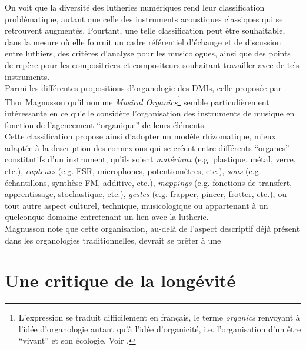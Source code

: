 \noindent On voit que la diversité des lutheries numériques rend leur classification problématique, autant que celle des instruments acoustiques classiques qui se retrouvent augmentés. Pourtant, une telle classification peut être souhaitable, dans la mesure où elle fournit un cadre référentiel d'échange et de discussion entre luthiers, des critères d'analyse pour les musicologues, ainsi que des points de repère pour les compositrices et compositeurs souhaitant travailler avec de tels instruments. \\
\indent Parmi les différentes propositions d'organologie des \glspl{DMI}, celle proposée par Thor Magnusson qu'il nomme \textit{Musical Organics}\footnote{L'expression se traduit difficilement en français, le terme \textit{organics} renvoyant à l'idée d'organologie autant qu'à l'idée d'organicité, i.e. l'organisation d'un être ``vivant'' et son écologie. Voir \cite{magnusson_musical_2017}.} semble particulièrement intéressante en ce qu'elle considère l'organisation des instruments de musique en fonction de l'agencement ``organique'' de leurs éléments.\\
\indent Cette classification propose ainsi d'adopter un modèle rhizomatique, mieux adaptée à la description des connexions qui se créent entre différents ``organes'' constitutifs d'un instrument, qu'ils soient \textit{matériaux} (e.g. plastique, métal, verre, etc.), \textit{capteurs} (e.g. \gls{FSR}, microphones, potentiomètres, etc.), \textit{sons} (e.g. échantillons, synthèse FM, additive, etc.), \textit{\glspl{mapping}} (e.g. fonctions de transfert, apprentissage, stochastique, etc.), \textit{gestes} (e.g. frapper, pincer, frotter, etc.), ou tout autre aspect culturel, technique, musicologique ou appartenant à un quelconque domaine entretenant un lien avec la lutherie.\\
\indent Magnusson note que cette organisation, au-delà de l'aspect descriptif déjà présent dans les organologies traditionnelles, devrait se prêter à une 

\section{Une critique de la longévité}
\label{sec:ephemerality:critique}

